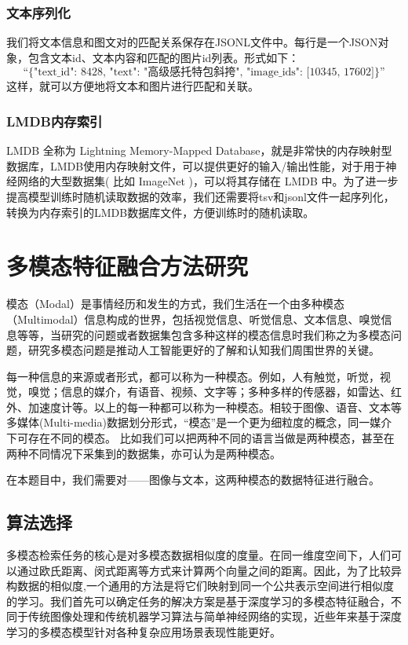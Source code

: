 \documentclass[a4paper]{zreport}
\begin{document}
\subsubsection{文本序列化}
我们将文本信息和图文对的匹配关系保存在JSONL文件中。每行是一个JSON对象，包含文本id、文本内容和匹配的图片id列表。形式如下：
$$\text{“\{"text\_id": 8428, "text": "高级感托特包斜挎", "image\_ids": [10345, 17602]\}”}$$
这样，就可以方便地将文本和图片进行匹配和关联。

\subsubsection{LMDB内存索引}
LMDB 全称为 Lightning Memory-Mapped Database，就是非常快的内存映射型数据库，LMDB使用内存映射文件，可以提供更好的输入/输出性能，对于用于神经网络的大型数据集( 比如 ImageNet )，可以将其存储在 LMDB 中。为了进一步提高模型训练时随机读取数据的效率，我们还需要将tsv和jsonl文件一起序列化，转换为内存索引的LMDB数据库文件，方便训练时的随机读取。

\section{多模态特征融合方法研究}

模态（Modal）是事情经历和发生的方式，我们生活在一个由多种模态（Multimodal）信息构成的世界，包括视觉信息、听觉信息、文本信息、嗅觉信息等等，当研究的问题或者数据集包含多种这样的模态信息时我们称之为多模态问题，研究多模态问题是推动人工智能更好的了解和认知我们周围世界的关键。

每一种信息的来源或者形式，都可以称为一种模态。例如，人有触觉，听觉，视觉，嗅觉；信息的媒介，有语音、视频、文字等；多种多样的传感器，如雷达、红外、加速度计等。以上的每一种都可以称为一种模态。相较于图像、语音、文本等多媒体(Multi-media)数据划分形式，“模态”是一个更为细粒度的概念，同一媒介下可存在不同的模态。 比如我们可以把两种不同的语言当做是两种模态，甚至在两种不同情况下采集到的数据集，亦可认为是两种模态。

在本题目中，我们需要对——图像与文本，这两种模态的数据特征进行融合。

\subsection{算法选择}

多模态检索任务的核心是对多模态数据相似度的度量。在同一维度空间下，人们可以通过欧氏距离、闵式距离等方式来计算两个向量之间的距离。因此，为了比较异构数据的相似度,一个通用的方法是将它们映射到同一个公共表示空间进行相似度的学习。我们首先可以确定任务的解决方案是基于深度学习的多模态特征融合，不同于传统图像处理和传统机器学习算法与简单神经网络的实现，近些年来基于深度学习的多模态模型针对各种复杂应用场景表现性能更好。
\end{document}
